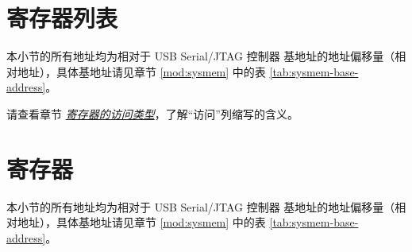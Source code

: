 \documentclass[main\_\_CN.tex]{subfiles}
\begin{document}



\clearpage
\section{寄存器列表}
\label{sec:usbserialjtag-reg-summ}
\hypertarget{usbserialjtag-reg-summ}{}

本小节的所有地址均为相对于 USB Serial/JTAG 控制器 基地址的地址偏移量（相对地址），具体基地址请见章节 \ref{mod:sysmem} \textit{} 中的表 \ref{tab:sysmem-base-address}。

请查看章节 \hyperref[glossary-access-types]{\textit{寄存器的访问类型}}，了解“访问”列缩写的含义。






\clearpage
\section{寄存器}

本小节的所有地址均为相对于 USB Serial/JTAG 控制器 基地址的地址偏移量（相对地址），具体基地址请见章节 \ref{mod:sysmem} \textit{} 中的表 \ref{tab:sysmem-base-address}。


\end{document}
